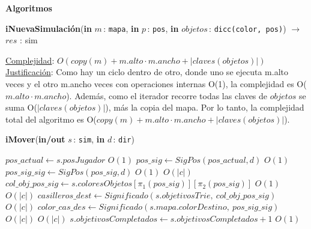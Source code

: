 \documentclass[a4paper,10pt]{article}
\let\TipoVariable=\texttt
\let\ModificadorArgumento=\textbf
\newcommand{\In}[2]{\ModificadorArgumento{in} \ensuremath{#1}\,: \TipoVariable{#2}\xspace}
\newcommand{\Inout}[2]{\ModificadorArgumento{in/out} \ensuremath{#1}\,: \TipoVariable{#2}\xspace}
\newenvironment{Algoritmos}{%
  \vspace*{2ex}%
  \noindent\textbf{\Large Algoritmos}%
  \vspace*{2ex}%
}{}
\begin{document}
\begin{Algoritmos}
\begin{algorithm}[H]{\textbf{iNuevaSimulación}(\In{m}{mapa}, \In{p}{pos}, \In{objetos}{dicc(color, pos)}) $\to$ $res$ : sim}
\begin{algorithmic}[1]
      \medskip
      \Statex \underline{Complejidad}: $O(copy(m) + m.alto \cdot m.ancho +|claves(objetos)|)$ 
      \Statex \underline{Justificación}: Como hay un ciclo dentro de otro, donde uno se ejecuta m.alto veces y el otro m.ancho veces con operaciones internas O(1), la complejidad es O($m.alto \cdot m.ancho$). Además, como el iterador recorre todas las claves de $objetos$ se suma O($|claves(objetos)|$), más la copia del mapa. Por lo tanto, la complejidad total del algoritmo es O($copy(m) + m.alto \cdot m.ancho +|claves(objetos)|$).
      \end{algorithmic}
\end{algorithm}    
  
\begin{algorithm}[H]{\textbf{iMover}}{(\Inout{s}{sim}, \In{d}{dir})}
      \begin{algorithmic}[1]
        \State $pos\_actual \gets s.posJugador$                                                                                                 \Comment $O(1)$ 
        \State $pos\_sig \gets SigPos(pos\_actual, d)$                                                                                          \Comment $O(1)$
        \State $pos\_sig\_sig \gets SigPos(pos\_sig, d)$                                                                                        \Comment $O(1)$
             \Comment $O(|c|)$
        \State $col\_obj\_pos\_sig \gets s.coloresObjetos[\pi_{1}(pos\_sig)][\pi_{2}(pos\_sig)]$                                                \Comment $O(1)$
                                                                                           \Comment $O(|c|)$                       
                \State $casilleros\_dest \gets Significado(s.objetivosTrie, \ col\_obj\_pos\_sig)$                                              \Comment $O(|c|)$
                \State $color\_cas\_des \gets Significado(s.mapa.colorDestino, \ pos\_sig\_sig)$                                                \Comment $O(|c|)$
                                                                                          \Comment $O(|c|)$  
                    \State $s.objetivosCompletados \gets s.objetivosCompletados + 1$                                                            \Comment $O(1)$ 

\end{algorithmic}
\end{algorithm}
\end{Algoritmos}
\end{document}

